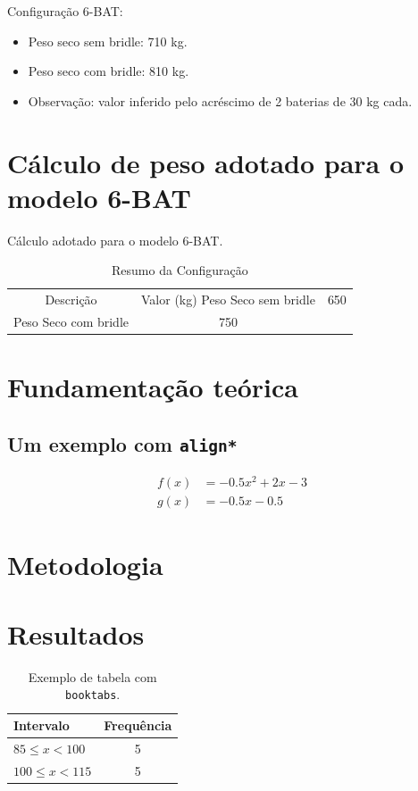 \documentclass[a4paper,12pt]{article}
\begin{document}
Configuração 6-BAT:
\begin{itemize}
\item Peso seco sem bridle: 710 kg.
\item Peso seco com bridle: 810 kg.
\item Observação: valor inferido pelo acréscimo de 2 baterias de 30 kg cada.
\end{itemize}

\section{Cálculo  de peso adotado para o modelo 6-BAT}

Cálculo adotado para o modelo 6-BAT.

\begin{table}[H]
\centering
\begin{tabular}{cc}
\toprule
Descrição  & Valor (kg)
\midrule
Peso Seco sem bridle & 650\\
Peso Seco com bridle & 750\\
\bottomrule
\end{tabular}
\caption{Resumo da Configuração}
\end{table}

\section{Fundamentação teórica}
\lipsum[3]

\subsection{Um exemplo com \texttt{align*}}
\begin{align*}
f(x) &= -0.5x^2 + 2x - 3 \\
g(x) &= -0.5x - 0.5
\end{align*}

\lipsum[4]

\section{Metodologia}
\lipsum[5]

\section{Resultados}
\lipsum[6]

\begin{table}[H]
\centering
\caption{Exemplo de tabela com \texttt{booktabs}.}
\label{tab:exemplo}
\setlength{\tabcolsep}{12pt}
\renewcommand{\arraystretch}{1.2}
\begin{tabular}{lc}
\toprule
\textbf{Intervalo} & \textbf{Frequência} \\
\midrule
$85 \le x < 100$  & 5 \\
$100 \le x < 115$ & 5 \\
\bottomrule
\end{tabular}
\end{table}
\end{document}
